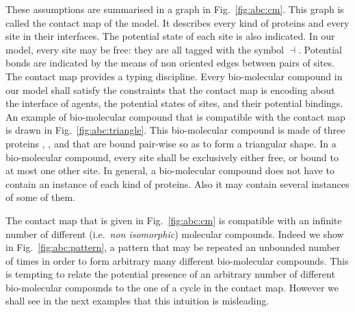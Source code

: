 \documentclass{entcs}
\newcommand{\freesymbol}{\dashv}
\begin{document}
These assumptions are summarised in a graph in Fig.~\ref{fig:abc:cm}. This graph is called the contact map of the model. It describes every kind of proteins and every site in their interfaces. The potential state of each site is also indicated. In our model, every site may be free: they are all tagged with the symbol $\freesymbol$. Potential bonds are indicated by the means of non oriented edges between pairs of sites.  The contact map provides a typing discipline.
Every bio-molecular compound in our model shall satisfy the constraints that the contact map is encoding about the interface of agents, the potential states of sites, and their potential bindings. An example of bio-molecular compound that is compatible with the contact map is drawn in Fig.~\ref{fig:abc:triangle}. This bio-molecular compound is made of three proteins , , and  that are bound pair-wise so as to form a triangular shape.
In a bio-molecular compound, every site shall be exclusively either free, or bound to at most one other site. In general, a bio-molecular compound does not have to contain an instance of each kind of proteins. Also it may contain several instances of some of them.

The contact map that is given in Fig.~\ref{fig:abc:cm} is compatible with an infinite number of different (i.e.~\emph{non isomorphic}) molecular compounds.
Indeed we show in Fig.~\ref{fig:abc:pattern}, a pattern
that may be repeated an unbounded number of times in order to form arbitrary many different bio-molecular compounds. This is tempting to relate the potential presence of an arbitrary number of different bio-molecular compounds to the one of a cycle in the contact map. However we shall see in the next examples that this intuition is misleading.
\end{document}
